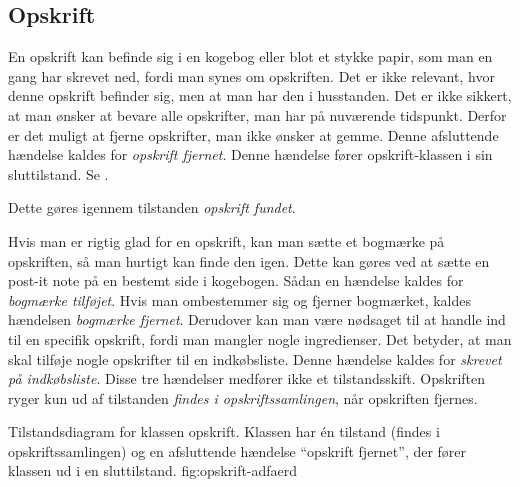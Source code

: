 \subsection{Opskrift}
En opskrift kan befinde sig i en kogebog eller blot et stykke papir, som man en gang har skrevet ned, fordi man synes om opskriften. Det er ikke relevant, hvor denne opskrift befinder sig, men at man har den i husstanden. Det er ikke sikkert, at man ønsker at bevare alle opskrifter, man har på nuværende tidspunkt. Derfor er det muligt at fjerne opskrifter, man ikke ønsker at gemme. Denne afsluttende hændelse kaldes for \textit{opskrift fjernet}. Denne hændelse fører opskrift-klassen i sin sluttilstand. Se .

 Dette gøres igennem tilstanden \textit{opskrift fundet}.

Hvis man er rigtig glad for en opskrift, kan man sætte et bogmærke på opskriften, så man hurtigt kan finde den igen. Dette kan \fx gøres ved at sætte en post-it note på en bestemt side i kogebogen. Sådan en hændelse kaldes for \textit{bogmærke tilføjet}. Hvis man ombestemmer sig og fjerner bogmærket, kaldes hændelsen \textit{bogmærke fjernet}. Derudover kan man være nødsaget til at handle ind til en specifik opskrift, fordi man mangler nogle ingredienser. Det betyder, at man skal tilføje nogle opskrifter til en indkøbsliste. Denne hændelse kaldes for \textit{skrevet på indkøbsliste}. Disse tre hændelser medfører ikke et tilstandsskift. Opskriften ryger kun ud af tilstanden \textit{findes i opskriftssamlingen}, når opskriften fjernes.

  {Tilstandsdiagram for klassen opskrift. Klassen har én tilstand (findes i opskriftssamlingen) og en afsluttende hændelse ``opskrift fjernet'', der fører klassen ud i en sluttilstand.}
  {fig:opskrift-adfaerd}

